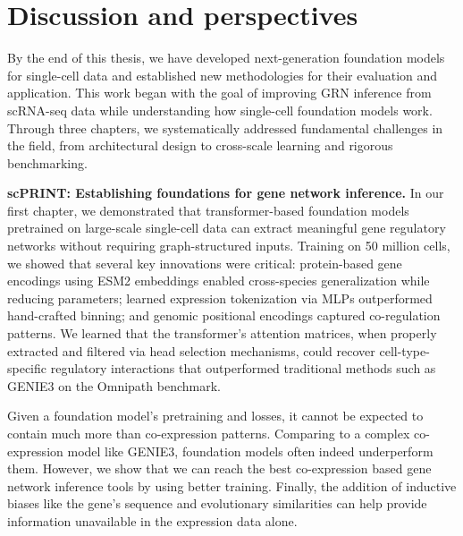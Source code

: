 \chapter{Discussion and perspectives} %

By the end of this thesis, we have developed next-generation foundation models for single-cell data and established new methodologies for their evaluation and application. This work began with the goal of improving \gls{GRN} inference from \gls{scRNA-seq} data while understanding how single-cell foundation models work. Through three chapters, we systematically addressed fundamental challenges in the field, from architectural design to cross-scale learning and rigorous benchmarking.

\textbf{scPRINT: Establishing foundations for gene network inference.} In our first chapter, we demonstrated that transformer-based foundation models pretrained on large-scale single-cell data can extract meaningful gene regulatory networks without requiring graph-structured inputs. Training on 50 million cells, we showed that several key innovations were critical: protein-based gene encodings using \gls{ESM}2 embeddings enabled cross-species generalization while reducing parameters; learned expression tokenization via \gls{MLP}s outperformed hand-crafted binning; and genomic positional encodings captured co-regulation patterns. We learned that the transformer's attention matrices, when properly extracted and filtered via head selection mechanisms, could recover cell-type-specific regulatory interactions that outperformed traditional methods such as GENIE3 on the Omnipath benchmark. \cite{badia-i-mompelGeneRegulatoryNetwork2023}

Given a foundation model's pretraining and losses, it cannot be expected to contain much more than co-expression patterns. Comparing to a complex co-expression model like GENIE3, foundation models often indeed underperform them. However, we show that we can reach the best co-expression based gene network inference tools by using better training. Finally, the addition of inductive biases like the gene's sequence and evolutionary similarities can help provide information unavailable in the expression data alone.

